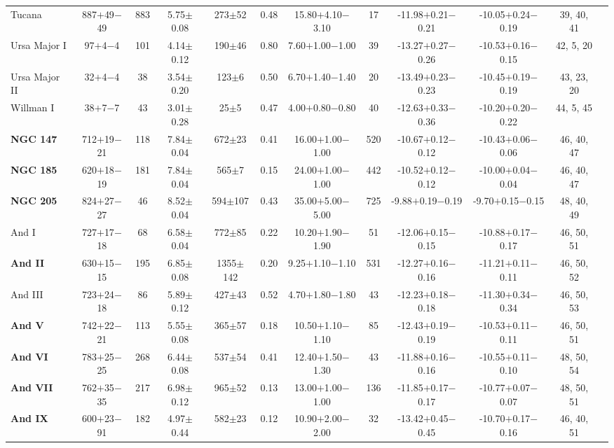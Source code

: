 \begin{table*}
\begin{center}
{\begin{tabular}{lccccccccccc}
Tucana & 887$+$49$-$49 & 883 & 5.75$\pm$0.08 & 273$\pm$52 & 0.48 & 15.80$+$4.10$-$3.10 & 17 & -11.98$+$0.21$-$0.21 & -10.05$+$0.24$-$0.19 & 39, 40, 41\\
Ursa Major I& 97$+$4$-$4 & 101 & 4.14$\pm$0.12 & 190$\pm$46 & 0.80 & 7.60$+$1.00$-$1.00 & 39 & -13.27$+$0.27$-$0.26 & -10.53$+$0.16$-$0.15 & 42, 5, 20\\
Ursa Major II & 32$+$4$-$4 & 38 & 3.54$\pm$0.20 & 123$\pm$6 & 0.50 & 6.70$+$1.40$-$1.40 & 20 & -13.49$+$0.23$-$0.23 & -10.45$+$0.19$-$0.19 & 43, 23, 20\\
Willman I & 38$+$7$-$7 & 43 & 3.01$\pm$0.28 & 25$\pm$5 & 0.47 & 4.00$+$0.80$-$0.80 & 40 & -12.63$+$0.33$-$0.36 & -10.20$+$0.20$-$0.22 & 44, 5, 45\\
\hline
\textbf{NGC 147} & 712$+$19$-$21 & 118 & 7.84$\pm$0.04 & 672$\pm$23 & 0.41 & 16.00$+$1.00$-$1.00 & 520 & -10.67$+$0.12$-$0.12 & -10.43$+$0.06$-$0.06 & 46, 40, 47\\
\textbf{NGC 185} & 620$+$18$-$19 & 181 & 7.84$\pm$0.04 & 565$\pm$7 & 0.15 & 24.00$+$1.00$-$1.00 & 442 & -10.52$+$0.12$-$0.12 & -10.00$+$0.04$-$0.04 & 46, 40, 47\\
\textbf{NGC 205} & 824$+$27$-$27 & 46 & 8.52$\pm$0.04 & 594$\pm$107 & 0.43 & 35.00$+$5.00$-$5.00 & 725 & -9.88$+$0.19$-$0.19 & -9.70$+$0.15$-$0.15 & 48, 40, 49\\
And I & 727$+$17$-$18 & 68 & 6.58$\pm$0.04 & 772$\pm$85 & 0.22 & 10.20$+$1.90$-$1.90 & 51 & -12.06$+$0.15$-$0.15 & -10.88$+$0.17$-$0.17 & 46, 50, 51\\
\textbf{And II} & 630$+$15$-$15 & 195 & 6.85$\pm$0.08 & 1355$\pm$142 & 0.20 & 9.25$+$1.10$-$1.10 & 531 & -12.27$+$0.16$-$0.16 & -11.21$+$0.11$-$0.11 & 46, 50, 52\\
And III & 723$+$24$-$18 & 86 & 5.89$\pm$0.12 & 427$\pm$43 & 0.52 & 4.70$+$1.80$-$1.80 & 43 & -12.23$+$0.18$-$0.18 & -11.30$+$0.34$-$0.34 & 46, 50, 53\\
\textbf{And V} & 742$+$22$-$21 & 113 & 5.55$\pm$0.08 & 365$\pm$57 & 0.18 & 10.50$+$1.10$-$1.10 & 85 & -12.43$+$0.19$-$0.19 & -10.53$+$0.11$-$0.11 & 46, 50, 51\\
\textbf{And VI} & 783$+$25$-$25 & 268 & 6.44$\pm$0.08 & 537$\pm$54 & 0.41 & 12.40$+$1.50$-$1.30 & 43 & -11.88$+$0.16$-$0.16 & -10.55$+$0.11$-$0.10 & 48, 50, 54\\
\textbf{And VII} & 762$+$35$-$35 & 217 & 6.98$\pm$0.12 & 965$\pm$52 & 0.13 & 13.00$+$1.00$-$1.00 & 136 & -11.85$+$0.17$-$0.17 & -10.77$+$0.07$-$0.07 & 48, 50, 51\\
\textbf{And IX} & 600$+$23$-$91 & 182 & 4.97$\pm$0.44 & 582$\pm$23 & 0.12 & 10.90$+$2.00$-$2.00 & 32 & -13.42$+$0.45$-$0.45 & -10.70$+$0.17$-$0.16 & 46, 40, 51\\

\end{tabular}}
\end{center}
\end{table*}
